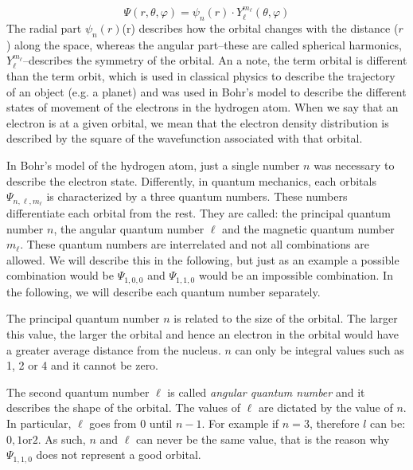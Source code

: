 \documentclass[main.tex]{subfiles}
\begin{document}
\begin{description}
 \begin{equation*}
\Psi(r, \theta, \varphi)=\psi_{n} (r) \cdot Y_{\ell}^{m_\ell}(\theta, \varphi)
\end{equation*}
The radial part $\psi_{n} (r)$(r) describes how the orbital changes with the distance ($r$) along the space, whereas the angular part--these are called spherical harmonics, $Y_{\ell}^{m_\ell}$--describes the symmetry of the orbital. An a note, the term orbital is different than the term orbit, which is used in classical physics to describe the trajectory of an object (e.g. a planet) and was used in Bohr's model to describe the different states of movement of the electrons in the hydrogen atom. When we say that an electron is at a given orbital, we mean that the electron density distribution is described by the square of the wavefunction associated with that orbital.
\item[\docfilehook{Orbitals are described by three quantum numbers}{}] 
In Bohr's model of the hydrogen atom, just a single number $n$ was necessary to describe the electron state. Differently, in quantum mechanics, each orbitals $\Psi_{n, \ell, m_\ell}$ is characterized by a three quantum numbers. These numbers differentiate each orbital from the rest. They are called: the principal quantum number $n$, the angular quantum number $\ell$ and the magnetic quantum number $m_{\ell}$. These quantum numbers are interrelated and not all combinations are allowed. We will describe this in the following, but just as an example a possible combination would be $\Psi_{1,0, 0}$ and $\Psi_{1,1, 0}$ would be an impossible combination. In the following, we will describe each quantum number separately. 
 \item[\docfilehook{Principal quantum number, $n$}{}]
The principal quantum number $n$ is related to the size of the orbital. The larger this value, the larger the orbital and hence an electron in the orbital would have a greater average distance from the nucleus. $n$ can only be integral values such as 1, 2 or 4 and it cannot be zero. 
 \item[\docfilehook{Angular quantum number, $\ell$}{}]
The second quantum number $\ell$ is called \emph{angular quantum number} and it describes the shape of the orbital. The values of $\ell$ are dictated by the value of $n$. In particular, $\ell$ goes from $0$ until $n-1$. For example if $n=3$, therefore $l$ can be: $0, 1 \text{or} 2$. As such, $n$ and $\ell$ can never be the same value, that is the reason why $\Psi_{1,1, 0}$ does not represent a good orbital.
 

\end{description}
\end{document}
